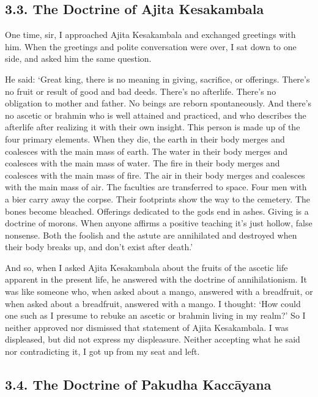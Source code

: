 \documentclass[12pt,openany]{book}%
\begin{document}
\subsection*{3.3. The Doctrine of Ajita Kesakambala }

One time, sir, I approached Ajita Kesakambala and exchanged greetings with him. When the greetings and polite conversation were over, I sat down to one side, and asked him the same question. 

He said: ‘Great king, there is no meaning in giving, sacrifice, or offerings. There’s no fruit or result of good and bad deeds. There’s no afterlife. There’s no obligation to mother and father. No beings are reborn spontaneously. And there’s no ascetic or brahmin who is well attained and practiced, and who describes the afterlife after realizing it with their own insight. This person is made up of the four primary elements. When they die, the earth in their body merges and coalesces with the main mass of earth. The water in their body merges and coalesces with the main mass of water. The fire in their body merges and coalesces with the main mass of fire. The air in their body merges and coalesces with the main mass of air. The faculties are transferred to space. Four men with a bier carry away the corpse. Their footprints show the way to the cemetery. The bones become bleached. Offerings dedicated to the gods end in ashes. Giving is a doctrine of morons. When anyone affirms a positive teaching it’s just hollow, false nonsense. Both the foolish and the astute are annihilated and destroyed when their body breaks up, and don’t exist after death.’ 

And so, when I asked Ajita Kesakambala about the fruits of the ascetic life apparent in the present life, he answered with the doctrine of annihilationism. It was like someone who, when asked about a mango, answered with a breadfruit, or when asked about a breadfruit, answered with a mango. I thought: ‘How could one such as I presume to rebuke an ascetic or brahmin living in my realm?’ So I neither approved nor dismissed that statement of Ajita Kesakambala. I was displeased, but did not express my displeasure. Neither accepting what he said nor contradicting it, I got up from my seat and left. 

\subsection*{3.4. The Doctrine of Pakudha \textsanskrit{Kaccāyana} }
\end{document}
